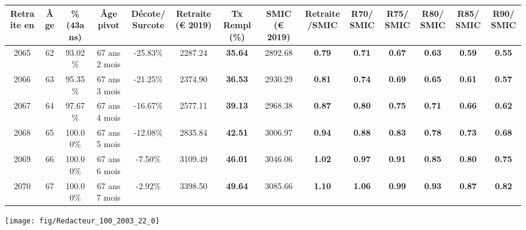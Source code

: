 \begin{adjustbox}{max width=\textwidth} 
\begin{tabular}[htb]{|c|c||c|c|c||c|c||c|c||c|c|c|c|c|} 
\hline 
 Retraite en &  Âge &  \%(43ans) &  Âge pivot &  Décote/Surcote &  Retraite (\euro{} 2019) &  Tx Rempl(\%) &  SMIC (\euro{} 2019) &  Retraite/SMIC &  R70/SMIC &  R75/SMIC &  R80/SMIC &  R85/SMIC &  R90/SMIC \\ 
\hline \hline 
 2065 &  62 &  93.02\% &  67 ans 2 mois &  -25.83\% &  2287.24 &  {\bf 35.64} &  2892.68 &  {\bf {\color{red} 0.79}} &  {\bf {\color{red} 0.71}} &  {\bf {\color{red} 0.67}} &  {\bf {\color{red} 0.63}} &  {\bf {\color{red} 0.59}} &  {\bf {\color{red} 0.55}} \\ 
\hline 
 2066 &  63 &  95.35\% &  67 ans 3 mois &  -21.25\% &  2374.90 &  {\bf 36.53} &  2930.29 &  {\bf {\color{red} 0.81}} &  {\bf {\color{red} 0.74}} &  {\bf {\color{red} 0.69}} &  {\bf {\color{red} 0.65}} &  {\bf {\color{red} 0.61}} &  {\bf {\color{red} 0.57}} \\ 
\hline 
 2067 &  64 &  97.67\% &  67 ans 4 mois &  -16.67\% &  2577.11 &  {\bf 39.13} &  2968.38 &  {\bf {\color{red} 0.87}} &  {\bf {\color{red} 0.80}} &  {\bf {\color{red} 0.75}} &  {\bf {\color{red} 0.71}} &  {\bf {\color{red} 0.66}} &  {\bf {\color{red} 0.62}} \\ 
\hline 
 2068 &  65 &  100.00\% &  67 ans 5 mois &  -12.08\% &  2835.84 &  {\bf 42.51} &  3006.97 &  {\bf {\color{red} 0.94}} &  {\bf {\color{red} 0.88}} &  {\bf {\color{red} 0.83}} &  {\bf {\color{red} 0.78}} &  {\bf {\color{red} 0.73}} &  {\bf {\color{red} 0.68}} \\ 
\hline 
 2069 &  66 &  100.00\% &  67 ans 6 mois &  -7.50\% &  3109.49 &  {\bf 46.01} &  3046.06 &  {\bf 1.02} &  {\bf {\color{red} 0.97}} &  {\bf {\color{red} 0.91}} &  {\bf {\color{red} 0.85}} &  {\bf {\color{red} 0.80}} &  {\bf {\color{red} 0.75}} \\ 
\hline 
 2070 &  67 &  100.00\% &  67 ans 7 mois &  -2.92\% &  3398.50 &  {\bf 49.64} &  3085.66 &  {\bf 1.10} &  {\bf 1.06} &  {\bf {\color{red} 0.99}} &  {\bf {\color{red} 0.93}} &  {\bf {\color{red} 0.87}} &  {\bf {\color{red} 0.82}} \\ 
\hline 
\hline 
\end{tabular} 
\end{adjustbox} 
 
 \vspace{0.1cm} 

 {\hspace{-2.2cm}\texttt{[image: fig/Redacteur\_100\_2003\_22\_0]}} 

